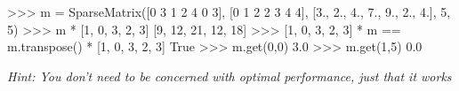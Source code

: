 \documentclass[]{article}
\newenvironment{Shaded}{}{}
\newcommand{\DecValTok}[1]{\textcolor[rgb]{0.25,0.63,0.44}{{#1}}}
\newcommand{\FloatTok}[1]{\textcolor[rgb]{0.25,0.63,0.44}{{#1}}}
\newcommand{\OtherTok}[1]{\textcolor[rgb]{0.00,0.44,0.13}{{#1}}}
\newcommand{\NormalTok}[1]{{#1}}
\begin{document}
\begin{Shaded}
\begin{Highlighting}[]
\NormalTok{>>> m = SparseMatrix([}\DecValTok{0} \DecValTok{3} \DecValTok{1} \DecValTok{2} \DecValTok{4} \DecValTok{0} \DecValTok{3}\NormalTok{], [}\DecValTok{0} \DecValTok{1} \DecValTok{2} \DecValTok{2} \DecValTok{3} \DecValTok{4} \DecValTok{4}\NormalTok{],}
             \NormalTok{[}\DecValTok{3}\NormalTok{., }\DecValTok{2}\NormalTok{., }\DecValTok{4}\NormalTok{., }\DecValTok{7}\NormalTok{., }\DecValTok{9}\NormalTok{., }\DecValTok{2}\NormalTok{., }\DecValTok{4}\NormalTok{.], }\DecValTok{5}\NormalTok{, }\DecValTok{5}\NormalTok{)}
\NormalTok{>>> m * [}\DecValTok{1}\NormalTok{, }\DecValTok{0}\NormalTok{, }\DecValTok{3}\NormalTok{, }\DecValTok{2}\NormalTok{, }\DecValTok{3}\NormalTok{]}
\NormalTok{[}\DecValTok{9}\NormalTok{, }\DecValTok{12}\NormalTok{, }\DecValTok{21}\NormalTok{, }\DecValTok{12}\NormalTok{, }\DecValTok{18}\NormalTok{]}
\NormalTok{>>> [}\DecValTok{1}\NormalTok{, }\DecValTok{0}\NormalTok{, }\DecValTok{3}\NormalTok{, }\DecValTok{2}\NormalTok{, }\DecValTok{3}\NormalTok{] * m == m.transpose() * [}\DecValTok{1}\NormalTok{, }\DecValTok{0}\NormalTok{, }\DecValTok{3}\NormalTok{, }\DecValTok{2}\NormalTok{, }\DecValTok{3}\NormalTok{]}
\OtherTok{True}
\NormalTok{>>> m.get(}\DecValTok{0}\NormalTok{,}\DecValTok{0}\NormalTok{)}
\FloatTok{3.0}
\NormalTok{>>> m.get(}\DecValTok{1}\NormalTok{,}\DecValTok{5}\NormalTok{)}
\FloatTok{0.0}
\end{Highlighting}
\end{Shaded}

\emph{Hint: You don't need to be concerned with optimal performance,
just that it works}
\end{document}
